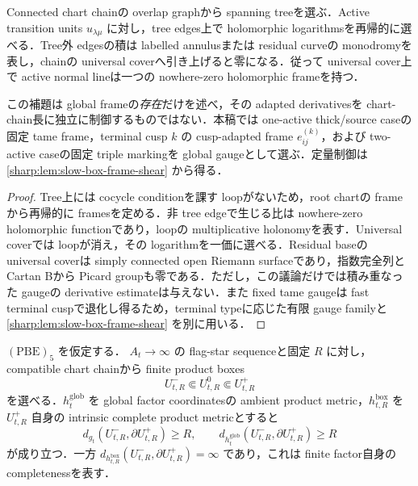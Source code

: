 \documentclass[a4paper,11pt]{ltjsarticle}
\numberwithin{equation}{section}
\theoremstyle{plain}
\theoremstyle{definition}
\theoremstyle{remark}
\begin{document}
\begin{lemma}\label{sharp:lem:cocycle-normalization}
Connected chart chainの overlap graphから spanning treeを選ぶ．Active transition units $u_{\lambda\mu}$ に対し，tree edges上で holomorphic logarithmsを再帰的に選べる．Tree外 edgesの積は labelled annulusまたは residual curveの monodromyを表し，chainの universal coverへ引き上げると零になる．従って universal cover上で active normal lineは一つの nowhere-zero holomorphic frameを持つ．

この補題は global frameの\emph{存在}だけを述べ，その adapted derivativesを chart-chain長に独立に制御するものではない．本稿では one-active thick/source caseの固定 tame frame，terminal cusp $k$ の cusp-adapted frame $e^{(k)}_{ij}$，および two-active caseの固定 triple markingを global gaugeとして選ぶ．定量制御は \cref{sharp:lem:slow-box-frame-shear} から得る．
\end{lemma}

\begin{proof}
Tree上には cocycle conditionを課す loopがないため，root chartの frameから再帰的に framesを定める．非 tree edgeで生じる比は nowhere-zero holomorphic functionであり，loopの multiplicative holonomyを表す．Universal coverでは loopが消え，その logarithmを一価に選べる．Residual baseの universal coverは simply connected open Riemann surfaceであり，指数完全列と Cartan Bから Picard groupも零である．ただし，この議論だけでは積み重なった gaugeの derivative estimateは与えない．また fixed tame gaugeは fast terminal cuspで退化し得るため，terminal typeに応じた有限 gauge familyと \cref{sharp:lem:slow-box-frame-shear} を別に用いる．
\end{proof}

\begin{lemma}\label{sharp:lem:artificial-boundary-escape}
$\mathrm{(PBE)}_5$ を仮定する．
$A_t\to\infty$ の flag-star sequenceと固定 $R$ に対し，compatible chart chainから finite product boxes
\[
 U^-_{t,R}\Subset U^0_{t,R}\Subset U^+_{t,R}
\]
を選べる．$h_t^{\mathrm{glob}}$ を global factor coordinatesの ambient product metric，$h_{t,R}^{\mathrm{box}}$ を $U^+_{t,R}$ 自身の intrinsic complete product metricとすると
\begin{equation}\label{sharp:eq:two-sided-boundary-escape}
 d_{g_t}(U^-_{t,R},\partial U^+_{t,R})\ge R,
 \qquad
 d_{h_t^{\mathrm{glob}}}(U^-_{t,R},\partial U^+_{t,R})\ge R
\end{equation}
が成り立つ．一方 $d_{h_{t,R}^{\mathrm{box}}}(U^-_{t,R},\partial U^+_{t,R})=\infty$ であり，これは finite factor自身の completenessを表す．
\end{lemma}
\end{document}
